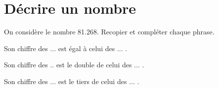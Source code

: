 \section{Décrire un nombre}

On considère le nombre \num{81.268}.
Recopier et compléter chaque phrase.
\begin{questions}
	
	
	\question Son chiffre des ... est égal à celui des ... .
	
	
	\question Son chiffre des .. est le double de celui des ... .
	
	
	\question Son chiffre des ... est le tiers de celui des ... .
	
	
\end{questions}


